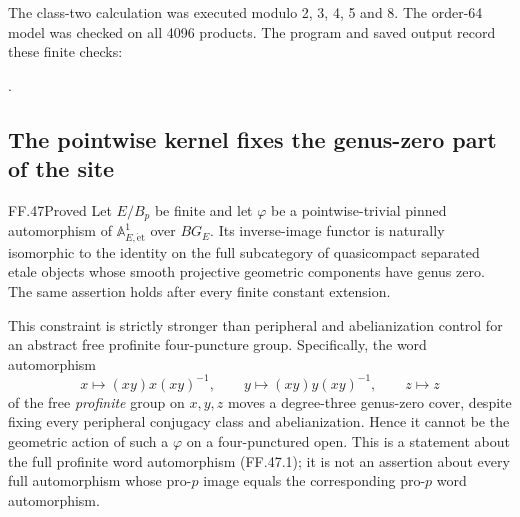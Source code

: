 The class-two calculation was executed modulo 2, 3, 4, 5 and 8. The order-64 model was checked on all 4096 products. The program and saved output record these finite checks:

.


\subsection{The pointwise kernel fixes the genus-zero part of the site}

\begin{claim}{FF.47}{Proved}\label{clm:FFgenuszerokernel}
Let \(E/B_p\) be finite and let \(\varphi\) be a
pointwise-trivial pinned automorphism of
\(\mathbb A^1_{E,\mathrm{\acute et}}\) over \(BG_E\).
Its inverse-image functor is naturally isomorphic to the
identity on the full subcategory of quasicompact separated
etale objects whose smooth projective geometric components
have genus zero. The same assertion holds after every
finite constant extension.

This constraint is strictly stronger than peripheral and
abelianization control for an abstract free profinite
four-puncture group. Specifically, the word automorphism
\[
 x\longmapsto(xy)x(xy)^{-1},\qquad
 y\longmapsto(xy)y(xy)^{-1},\qquad z\longmapsto z
                                                        \tag{FF.47.1}
\]
of the free \emph{profinite} group on \(x,y,z\) moves
a degree-three genus-zero cover, despite fixing every
peripheral conjugacy class and abelianization. Hence it
cannot be the geometric action of such a \(\varphi\)
on a four-punctured open. This is a statement about the
full profinite word automorphism (FF.47.1); it is not an
assertion about every full automorphism whose pro-\(p\)
image equals the corresponding pro-\(p\) word automorphism.
\end{claim}

